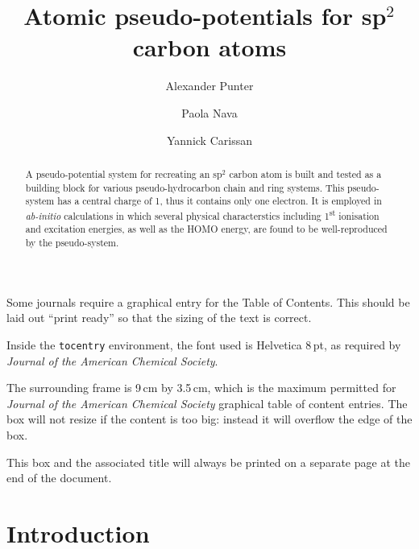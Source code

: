 \documentclass[journal=jctcce,manuscript=article]{achemso}
\author{Alexander Punter}
\author{Paola Nava}
\author{Yannick Carissan}
\affiliation[Aix-Marseille University]
{Aix Marseille Univ, CNRS, Centrale Marseille, iSm2, Marseille, France}
\title[A great title]
  {Atomic pseudo-potentials for sp$^2$ carbon atoms}
\begin{document}
\begin{tocentry}

Some journals require a graphical entry for the Table of Contents.
This should be laid out ``print ready'' so that the sizing of the
text is correct.

Inside the \texttt{tocentry} environment, the font used is Helvetica
8\,pt, as required by \emph{Journal of the American Chemical
Society}.

The surrounding frame is 9\,cm by 3.5\,cm, which is the maximum
permitted for  \emph{Journal of the American Chemical Society}
graphical table of content entries. The box will not resize if the
content is too big: instead it will overflow the edge of the box.

This box and the associated title will always be printed on a
separate page at the end of the document.

\end{tocentry}

\begin{abstract}
A pseudo-potential system for recreating an sp\(^{2}\) carbon atom is built 
and tested as a building block for various pseudo-hydrocarbon chain and ring systems.  
This pseudo-system has a central charge of 1, thus it contains only one
electron. It is employed in \textsl{ab-initio} calculations in which several physical characterstics
including 1\textsuperscript{st} ionisation and excitation energies, as well as the HOMO energy, 
are found to be well-reproduced by the pseudo-system.
\end{abstract}

\section{Introduction}
\end{document}
